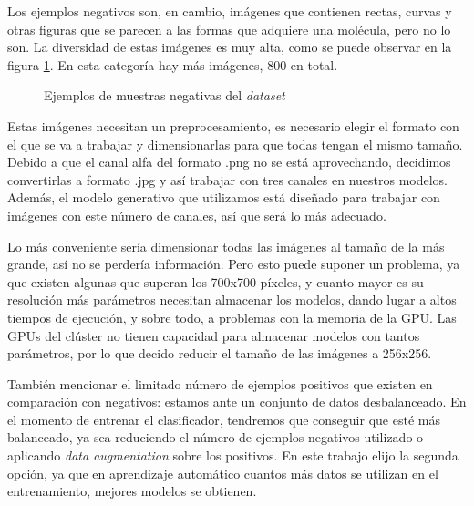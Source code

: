 Los ejemplos negativos son, en cambio, imágenes que contienen rectas, curvas y otras figuras que se parecen a las formas que adquiere una molécula, pero no lo son. La diversidad de estas imágenes es muy alta, como se puede observar en la figura \ref{fig:negative_examples}. En esta categoría hay más imágenes, 800 en total.

\begin{figure}[H]
\centering
    \caption{Ejemplos de muestras negativas del \textit{dataset}}
    \label{fig:negative_examples}
\end{figure}

Estas imágenes necesitan un preprocesamiento, es necesario elegir el formato con el que se va a trabajar y dimensionarlas para que todas tengan el mismo tamaño. Debido a que el canal alfa del formato .png no se está aprovechando, decidimos convertirlas a formato .jpg y así trabajar con tres canales en nuestros modelos. Además, el modelo generativo que utilizamos está diseñado para trabajar con imágenes con este número de canales, así que será lo más adecuado.

Lo más conveniente sería dimensionar todas las imágenes al tamaño de la más grande, así no se perdería información. Pero esto puede suponer un problema, ya que existen algunas que superan los 700x700 píxeles, y cuanto mayor es su resolución más parámetros necesitan almacenar los modelos, dando lugar a altos tiempos de ejecución, y sobre todo, a problemas con la memoria de la GPU. Las GPUs del clúster no tienen capacidad para almacenar modelos con tantos parámetros, por lo que decido reducir el tamaño de las imágenes a 256x256. 

También mencionar el limitado número de ejemplos positivos que existen en comparación con negativos: estamos ante un conjunto de datos desbalanceado. En el momento de entrenar el clasificador, tendremos que conseguir que esté más balanceado, ya sea reduciendo el número de ejemplos negativos utilizado o aplicando \textit{data augmentation} sobre los positivos. En este trabajo elijo la segunda opción, ya que en aprendizaje automático cuantos más datos se utilizan en el entrenamiento, mejores modelos se obtienen. 

